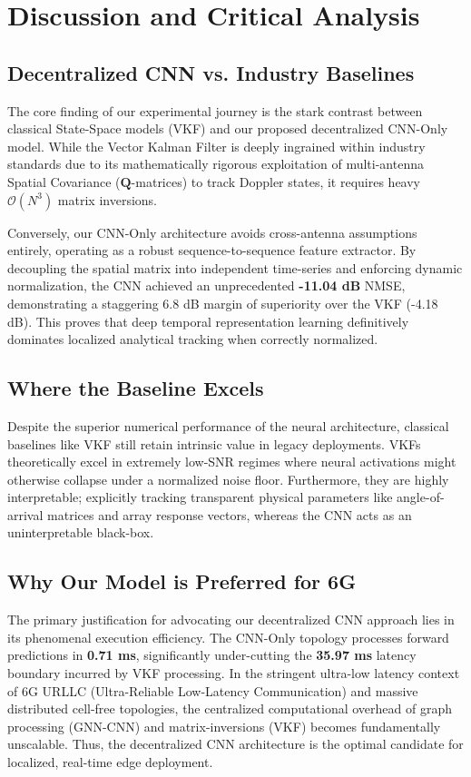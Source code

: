 \documentclass[conference]{IEEEtran}
\begin{document}
\section{Discussion and Critical Analysis}

\subsection{Decentralized CNN vs. Industry Baselines}
The core finding of our experimental journey is the stark contrast between classical State-Space models (VKF) and our proposed decentralized CNN-Only model. While the Vector Kalman Filter is deeply ingrained within industry standards due to its mathematically rigorous exploitation of multi-antenna Spatial Covariance ($\mathbf{Q}$-matrices) to track Doppler states, it requires heavy $\mathcal{O}(N^3)$ matrix inversions. 

Conversely, our CNN-Only architecture avoids cross-antenna assumptions entirely, operating as a robust sequence-to-sequence feature extractor. By decoupling the spatial matrix into independent time-series and enforcing dynamic normalization, the CNN achieved an unprecedented \textbf{-11.04 dB} NMSE, demonstrating a staggering 6.8 dB margin of superiority over the VKF (-4.18 dB). This proves that deep temporal representation learning definitively dominates localized analytical tracking when correctly normalized.

\subsection{Where the Baseline Excels}
Despite the superior numerical performance of the neural architecture, classical baselines like VKF still retain intrinsic value in legacy deployments. VKFs theoretically excel in extremely low-SNR regimes where neural activations might otherwise collapse under a normalized noise floor. Furthermore, they are highly interpretable; explicitly tracking transparent physical parameters like angle-of-arrival matrices and array response vectors, whereas the CNN acts as an uninterpretable black-box.

\subsection{Why Our Model is Preferred for 6G}
The primary justification for advocating our decentralized CNN approach lies in its phenomenal execution efficiency. The CNN-Only topology processes forward predictions in \textbf{0.71 ms}, significantly under-cutting the \textbf{35.97 ms} latency boundary incurred by VKF processing. In the stringent ultra-low latency context of 6G URLLC (Ultra-Reliable Low-Latency Communication) and massive distributed cell-free topologies, the centralized computational overhead of graph processing (GNN-CNN) and matrix-inversions (VKF) becomes fundamentally unscalable. Thus, the decentralized CNN architecture is the optimal candidate for localized, real-time edge deployment.
\end{document}
